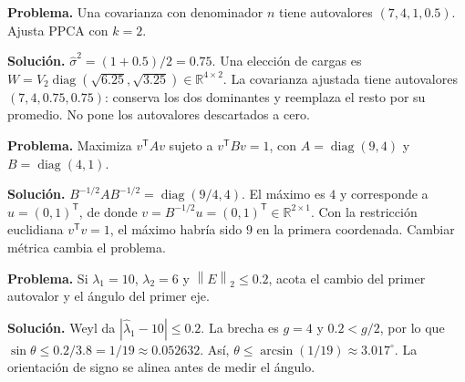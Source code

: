 \documentclass[11pt,a4paper]{article}
\newcommand{\R}{\mathbb R}
\newcommand{\T}{^{\mathsf T}}
\newcommand{\norm}[1]{\left\lVert #1\right\rVert}
\DeclareMathOperator{\diag}{diag}
\theoremstyle{definition}
\begin{document}
\begin{ejemplo}
\textbf{Problema.} Una covarianza con denominador $n$ tiene autovalores $(7,4,1,0.5)$. Ajusta PPCA con $k=2$.

\textbf{Solución.} $\widehat\sigma^2=(1+0.5)/2=0.75$. Una elección de cargas es $W=V_2\diag(\sqrt{6.25},\sqrt{3.25})\in\R^{4\times2}$. La covarianza ajustada tiene autovalores $(7,4,0.75,0.75)$: conserva los dos dominantes y reemplaza el resto por su promedio. No pone los autovalores descartados a cero.
\end{ejemplo}
\begin{ejemplo}
\textbf{Problema.} Maximiza $v\T Av$ sujeto a $v\T Bv=1$, con $A=\diag(9,4)$ y $B=\diag(4,1)$.

\textbf{Solución.} $B^{-1/2}AB^{-1/2}=\diag(9/4,4)$. El máximo es $4$ y corresponde a $u=(0,1)\T$, de donde $v=B^{-1/2}u=(0,1)\T\in\R^{2\times1}$. Con la restricción euclidiana $v\T v=1$, el máximo habría sido $9$ en la primera coordenada. Cambiar métrica cambia el problema.
\end{ejemplo}
\begin{ejemplo}
\textbf{Problema.} Si $\lambda_1=10$, $\lambda_2=6$ y $\norm E_2\le0.2$, acota el cambio del primer autovalor y el ángulo del primer eje.

\textbf{Solución.} Weyl da $|\widehat\lambda_1-10|\le0.2$. La brecha es $g=4$ y $0.2<g/2$, por lo que $\sin\theta\le0.2/3.8=1/19\approx0.052632$. Así, $\theta\le\arcsin(1/19)\approx3.017^\circ$. La orientación de signo se alinea antes de medir el ángulo.
\end{ejemplo}
\end{document}
